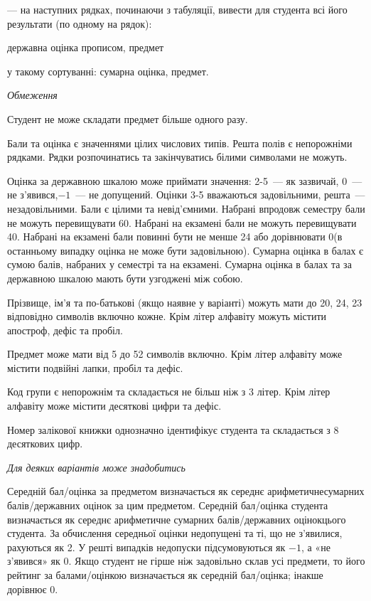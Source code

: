 \documentclass[11pt, ukrainian]{article}
\begin{document}
{\noindent}--- на наступних рядках, починаючи з табуляції, вивести для студента всі його результати (по одному на рядок):\par
державна оцінка прописом, предмет

{\noindent}у такому сортуванні: сумарна оцінка, предмет.


\bigskip\textit{Обмеження}

Студент не може складати предмет більше одного разу.

Бали та оцінка є значеннями цілих числових типів. Решта полів є непорожніми рядками.
Рядки розпочинатись та закінчуватись білими символами не можуть.

Оцінка за державною шкалою може приймати значення: 2-5~--- як зазвичай, 0~--- не з’явився,$-1$~--- не допущений. 
Оцінки 3-5 вважаються задовільними, решта~--- незадовільними. 
Бали є цілими та невід’ємними.
Набрані впродовж семестру бали не можуть перевищувати 60. 
Набрані на екзамені бали не можуть перевищувати 40. 
Набрані на екзамені бали повинні бути не менше 24 або дорівнювати 0(в останньому випадку оцінка не може бути задовільною). 
Сумарна оцінка в балах є сумою балів, набраних у семестрі та на екзамені.
Сумарна оцінка в балах та за державною шкалою мають бути узгоджені між собою.

Прізвище, ім’я та по-батькові (якщо наявне у варіанті) можуть мати до 20, 24, 23 відповідно символів включно кожне. 
Крім літер алфавіту можуть містити апостроф, дефіс та пробіл.

Предмет може мати від 5 до 52 символів включно. 
Крім літер алфавіту може містити подвійні лапки, пробіл та дефіс.

Код групи є непорожнім та складається не більш ніж з 3 літер. 
Крім літер алфавіту може містити десяткові цифри та дефіс.


Номер залікової книжки однозначно ідентифікує студента та складається з 8 десяткових цифр. 

\bigskip\textit{Для деяких варіантів може знадобитись}

Середній бал/оцінка за предметом визначається як середнє арифметичнесумарних балів/державних оцінок за цим предметом. 
Середній бал/оцінка студента визначається як середнє арифметичне сумарних балів/державних оцінокцього студента. 
За обчислення середньої оцінки недопущені та ті, що не з’явилися, рахуються як 2.
У решті випадків недопуски підсумовуються як $-1$, а «не з’явився» як 0.
Якщо студент не гірше ніж задовільно склав усі предмети, 
то його рейтинг за балами/оцінкою визначається як середній бал/оцінка; інакше дорівнює 0.
\end{document}
